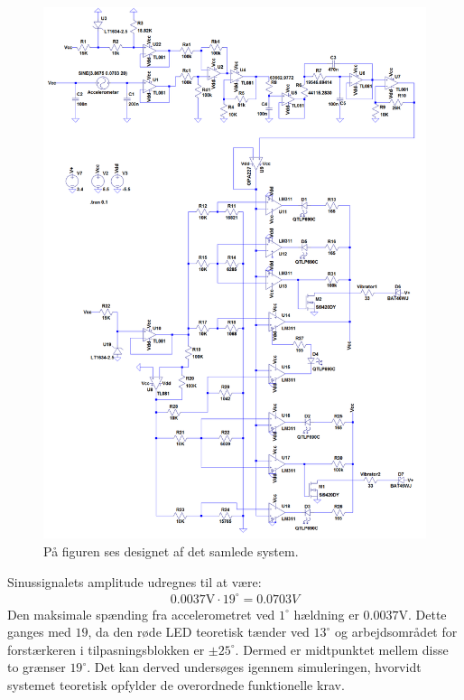 \begin{figure}[H]
	\centering
	\includegraphics[scale=.42]{figures/cProblemloesning/Samlet_systemUL2.PNG}
	\caption{På figuren ses designet af det samlede system.}
	\label{fig:samlet_system}
\end{figure}
\clearpage
\noindent Sinussignalets amplitude udregnes til at være:
\begin{eqnarray}
0.0037\text{V} \cdot 19^{\circ} = 0.0703V
\end{eqnarray}
\noindent Den maksimale spænding fra accelerometret ved $1^{\circ}$ hældning er $0.0037$V. Dette ganges med $19$, da den røde LED teoretisk tænder ved $13^{\circ}$ og arbejdsområdet for forstærkeren i tilpasningsblokken er $\pm25^{\circ}$. Dermed er midtpunktet mellem disse to grænser $19^{\circ}$. Det kan derved undersøges igennem simuleringen, hvorvidt systemet teoretisk opfylder de overordnede funktionelle krav.\\
